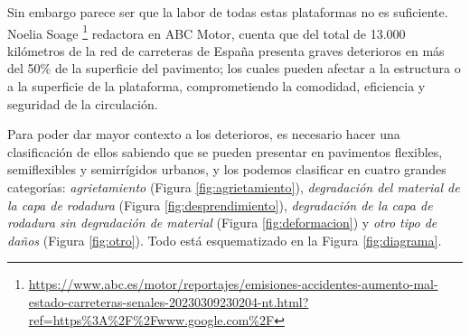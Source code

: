 Sin embargo parece ser que la labor de todas estas plataformas no es suficiente. Noelia Soage \footnote{\url{https://www.abc.es/motor/reportajes/emisiones-accidentes-aumento-mal-estado-carreteras-senales-20230309230204-nt.html?ref=https\%3A\%2F\%2Fwww.google.com\%2F}} redactora en ABC Motor, cuenta que del total de 13.000 kilómetros de la red de carreteras de España presenta graves deterioros en más del 50\% de la superficie del pavimento; los cuales pueden afectar a la estructura o a la superficie de la plataforma, comprometiendo la comodidad, eficiencia y seguridad de la circulación.


Para poder dar mayor contexto a los deterioros, es necesario hacer una clasificación de ellos sabiendo que se pueden presentar en pavimentos flexibles, semiflexibles y semirrígidos urbanos, y los podemos clasificar en cuatro grandes categorías: \textit{agrietamiento} (Figura \ref{fig:agrietamiento}), \textit{degradación del material de la capa de rodadura} (Figura \ref{fig:desprendimiento}), \textit{degradación de la capa de rodadura sin degradación de material} (Figura \ref{fig:deformacion}) y \textit{otro tipo de daños} (Figura \ref{fig:otro}). Todo está esquematizado en la Figura \ref{fig:diagrama}.\\

